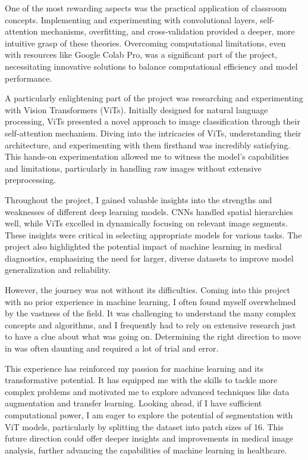 One of the most rewarding aspects was the practical application of classroom concepts. Implementing and experimenting with convolutional layers, self-attention mechanisms, overfitting, and cross-validation provided a deeper, more intuitive grasp of these theories. Overcoming computational limitations, even with resources like Google Colab Pro, was a significant part of the project, necessitating innovative solutions to balance computational efficiency and model performance.

A particularly enlightening part of the project was researching and experimenting with Vision Transformers (ViTs). Initially designed for natural language processing, ViTs presented a novel approach to image classification through their self-attention mechanism. Diving into the intricacies of ViTs, understanding their architecture, and experimenting with them firsthand was incredibly satisfying. This hands-on experimentation allowed me to witness the model's capabilities and limitations, particularly in handling raw images without extensive preprocessing.

Throughout the project, I gained valuable insights into the strengths and weaknesses of different deep learning models. CNNs handled spatial hierarchies well, while ViTs excelled in dynamically focusing on relevant image segments. These insights were critical in selecting appropriate models for various tasks. The project also highlighted the potential impact of machine learning in medical diagnostics, emphasizing the need for larger, diverse datasets to improve model generalization and reliability.

However, the journey was not without its difficulties. Coming into this project with no prior experience in machine learning, I often found myself overwhelmed by the vastness of the field. It was challenging to understand the many complex concepts and algorithms, and I frequently had to rely on extensive research just to have a clue about what was going on. Determining the right direction to move in was often daunting and required a lot of trial and error.

This experience has reinforced my passion for machine learning and its transformative potential. It has equipped me with the skills to tackle more complex problems and motivated me to explore advanced techniques like data augmentation and transfer learning. Looking ahead, if I have sufficient computational power, I am eager to explore the potential of segmentation with ViT models, particularly by splitting the dataset into patch sizes of 16. This future direction could offer deeper insights and improvements in medical image analysis, further advancing the capabilities of machine learning in healthcare.

